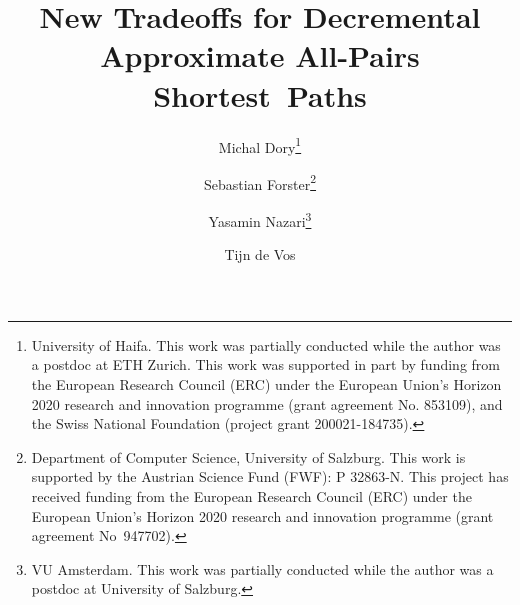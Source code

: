 \documentclass[11pt]{article}
\title{New Tradeoffs for Decremental Approximate All-Pairs Shortest~Paths}
\author{Michal Dory\thanks{University of Haifa. This work was partially conducted while the author was a postdoc at ETH Zurich. This work was supported in part by funding from the European Research Council (ERC) under the European Union’s Horizon 2020 research and innovation programme (grant agreement No. 853109), and the Swiss National Foundation (project grant 200021-184735).} \and  Sebastian Forster\thanks{Department of Computer Science, University of Salzburg. This work is supported by the Austrian Science Fund (FWF): P 32863-N. This project has received funding from the European Research Council (ERC) under the European Union's Horizon 2020 research and innovation programme (grant agreement No~947702).} \and Yasamin Nazari\thanks{VU Amsterdam. This work was partially conducted while the author was a postdoc at University of Salzburg.} \and Tijn de Vos\samethanks[2]}
\date{}
\theoremstyle{definition}
\theoremstyle{remark}
\begin{document}
\begin{titlepage}
\maketitle
\begin{abstract}
         
\end{abstract}

\thispagestyle{empty}
\newpage

\tableofcontents
\thispagestyle{empty}
\end{titlepage}

\newpage


















\appendix\newpage

\end{document}

